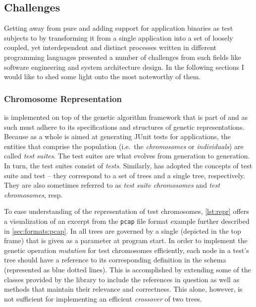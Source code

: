\subsection{Challenges}
Getting away from pure \java and adding support for application binaries as test subjects 
to \xmlmate by transforming it from 
a single \java application into a set of loosely coupled, yet interdependent and distinct 
processes written in different programming languages presented a number of challenges from 
such fields like software engineering and system architecture design. 
In the following sections I would like to shed some light onto 
the most noteworthy of them.
\subsubsection{Chromosome Representation}
\label{sec:repr}
\xmlmate is implemented on top of the genetic algorithm framework that is part of 
\evosuite{}\cite{fraser2013whole} and as such must adhere to its specifications and structures 
of genetic representations. 
Because \evosuite as a whole is aimed at generating JUnit tests for \java applications, 
the entities that comprise the population  (i.e.\ the \emph{chromosomes} or \emph{individuals}) 
are called \emph{test suites}. The test suites are what evolves from generation to generation.
In turn, the test suites consist of \emph{tests}. Similarly, \xmlmate has adopted the concepts of 
test suite and test -- they correspond to a set of \xml trees and a single \xml tree, respectively. 
They are also sometimes referred to as \emph{test suite chromosomes} and \emph{test chromosomes}, resp.

To ease understanding of the representation of \xml test chromosomes, \cref{lst:repr} offers a
visualization of an excerpt from the \texttt{pcap} file format example further described in
\cref{sec:formats:pcap}. In \xmlmate all \xml trees are governed by a single \xsd (depicted in the top frame)
that is given as a parameter at program start. In order to implement the genetic operation \emph{mutation} for
test chromosomes efficiently, each node in a test's \xml tree should have a reference to its
corresponding definition in the schema (represented as blue dotted lines). This is accomplished by extending
some of the \java classes provided by the \xom library to include the references in question as well as methods
that maintain their relevance and correctness. This alone, however, is not sufficient for implementing an
efficient \emph{crossover} of two \xml trees.

